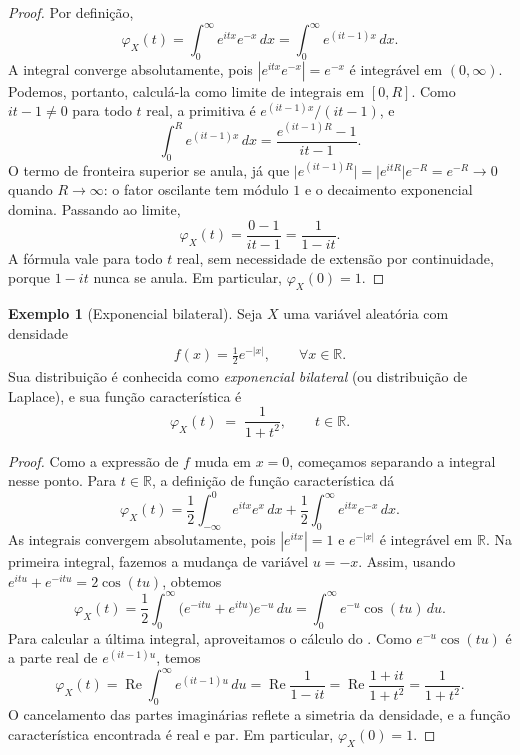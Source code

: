 \documentclass[12pt,portuguese]{article}
\theoremstyle{definition}
\newtheorem{example}[example]{Exemplo}
\theoremstyle{plainexercise}
\theoremstyle{starredexercise}
\theoremstyle{definition}
\begin{document}
\begin{proof}
Por definição,
\[
\varphi_X(t)=\int_{0}^{\infty}e^{itx}e^{-x}\,dx
=\int_{0}^{\infty}e^{(it-1)x}\,dx.
\]
A integral converge absolutamente, pois $|e^{itx}e^{-x}|=e^{-x}$ é integrável
em $(0,\infty)$. Podemos, portanto, calculá-la como limite de integrais em
$[0,R]$. Como $it-1\neq0$ para todo $t$ real, a primitiva é
$e^{(it-1)x}/(it-1)$, e
\[
\int_{0}^{R}e^{(it-1)x}\,dx=\frac{e^{(it-1)R}-1}{it-1}.
\]
O termo de fronteira superior se anula, já que
$\bigl|e^{(it-1)R}\bigr|=\bigl|e^{itR}\bigr|e^{-R}=e^{-R}\to0$ quando
$R\to\infty$: o fator oscilante tem módulo $1$ e o decaimento exponencial
domina. Passando ao limite,
\[
\varphi_X(t)=\frac{0-1}{it-1}=\frac{1}{1-it}.
\]
A fórmula vale para todo $t$ real, sem necessidade de extensão por continuidade,
porque $1-it$ nunca se anula. Em particular, $\varphi_X(0)=1$.
\end{proof}

\medskip

\begin{example}[Exponencial bilateral]\label{ex:exponencial-bilateral}
Seja $X$ uma variável aleatória com densidade 
\begin{align*}
f(x)=\frac{1}{2}e^{-|x|},\qquad  \forall x\in\mathbb{R}.
\end{align*} 
Sua distribuição é conhecida como \emph{exponencial
bilateral} (ou distribuição de Laplace), e sua função característica é
\[
  \varphi_X(t) \;=\; \frac{1}{1+t^2}, \qquad t\in\mathbb{R}.
\]
\end{example}

\begin{proof}
Como a expressão de $f$ muda em $x=0$, começamos separando a integral nesse
ponto. Para $t\in\mathbb{R}$, a definição de função característica dá
\[
  \varphi_X(t)
  = \frac12\int_{-\infty}^{0} e^{itx}e^{x}\,dx
    + \frac12\int_{0}^{\infty} e^{itx}e^{-x}\,dx.
\]
As integrais convergem absolutamente, pois $|e^{itx}|=1$ e $e^{-|x|}$ é
integrável em $\mathbb{R}$. Na primeira integral, fazemos a mudança de
variável $u=-x$. Assim, usando $e^{itu}+e^{-itu}=2\cos(tu)$, obtemos
\[
  \varphi_X(t)
  = \frac12\int_{0}^{\infty}\bigl(e^{-itu}+e^{itu}\bigr)e^{-u}\,du
  = \int_{0}^{\infty}e^{-u}\cos(tu)\,du.
\]
Para calcular a última integral, aproveitamos o cálculo do
. Como $e^{-u}\cos(tu)$ é a parte real de
$e^{(it-1)u}$, temos
\[
  \varphi_X(t)
  = \operatorname{Re}\int_{0}^{\infty}e^{(it-1)u}\,du
  = \operatorname{Re}\frac{1}{1-it}
  = \operatorname{Re}\frac{1+it}{1+t^{2}}
  = \frac{1}{1+t^{2}}.
\]
O cancelamento das partes imaginárias reflete a simetria da densidade, e a
função característica encontrada é real e par. Em particular, $\varphi_X(0)=1$.
\end{proof}
\end{document}

